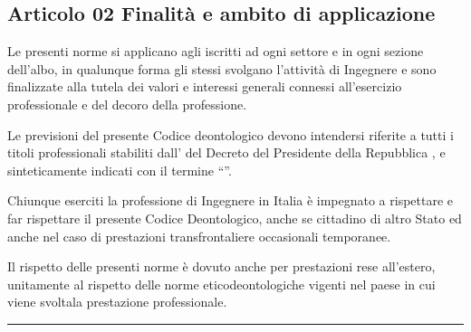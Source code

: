 \documentclass[letterpaper,10pt,italian]{sphinxmanual}
\begin{document}
\subsection{Articolo 02 \sphinxhyphen{} Finalità e ambito di applicazione}
\label{\detokenize{capitoli/codice/codice_deontologico:articolo-02-finalita-e-ambito-di-applicazione}}\begin{description}
\sphinxAtStartPar
Le presenti norme si applicano agli iscritti ad ogni settore e in ogni sezione dell’albo, in qualunque forma gli stessi svolgano l’attività di Ingegnere e sono finalizzate alla tutela dei valori e interessi generali connessi all’esercizio professionale e del decoro della professione.

\sphinxAtStartPar
Le previsioni del presente Codice deontologico devono intendersi riferite a tutti i titoli professionali stabiliti dall’ del Decreto del Presidente della Repubblica , e sinteticamente indicati con il termine “”.

\sphinxAtStartPar
Chiunque eserciti la professione di Ingegnere in Italia è impegnato a rispettare e far rispettare il presente Codice Deontologico, anche se cittadino di altro Stato ed anche nel caso di prestazioni transfrontaliere occasionali temporanee.

\sphinxAtStartPar
Il rispetto delle presenti norme è dovuto anche per prestazioni rese all’estero, unitamente al rispetto delle norme etico\sphinxhyphen{}deontologiche vigenti nel paese in cui viene svoltala prestazione professionale.

\end{description}


\bigskip\hrule\bigskip



\section{}
\label{\detokenize{capitoli/codice/codice_deontologico:capo-ii-doveri-generali}}
\end{document}
